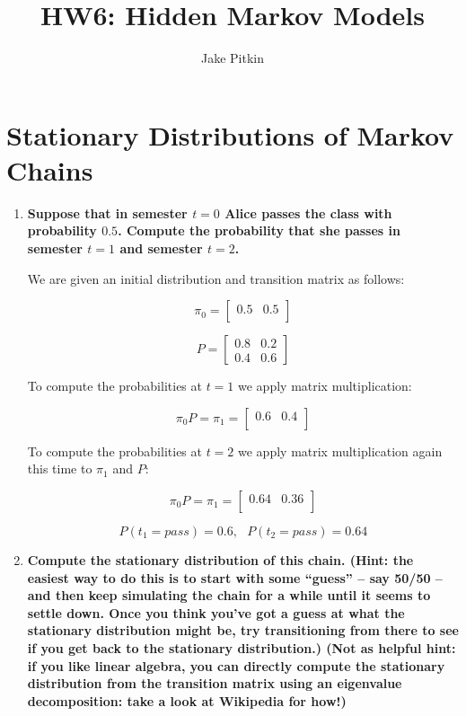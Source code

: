 \documentclass[fleqn]{hermans-hw}
\title{HW6: Hidden Markov Models}
\institute{University of Utah}
\author{Jake Pitkin}
\begin{document}
\maketitle
\section{Stationary Distributions of Markov Chains}

\begin{enumerate}
\item {\bf Suppose that in semester $t=0$ Alice passes the class with
  probability $0.5$.  Compute the probability that she passes in
  semester $t=1$ and semester $t=2$.}
  
We are given an initial distribution and transition matrix as follows:

$$\pi_0 = \begin{bmatrix} 0.5 & 0.5 \\ \end{bmatrix}$$

$$P = \begin{bmatrix}
 0.8 & 0.2 \\
 0.4 & 0.6
\end{bmatrix}$$

To compute the probabilities at $t = 1$ we apply matrix multiplication:

$$\pi_0 P = \pi_1 = \begin{bmatrix} 0.6 & 0.4 \\ \end{bmatrix}$$

To compute the probabilities at $t = 2$ we apply matrix multiplication again this time to $\pi_1$ and $P$:

$$\pi_0 P = \pi_1 = \begin{bmatrix} 0.64 & 0.36 \\ \end{bmatrix}$$

$$\boxed{P(t_1 = pass) = 0.6, \ \ \ P(t_2 = pass) = 0.64}$$

\item {\bf Compute the stationary distribution of this chain.  (Hint: the
  easiest way to do this is to start with some ``guess'' -- say 50/50
  -- and then keep simulating the chain for a while until it seems to
  settle down.  Once you think you've got a guess at what the
  stationary distribution might be, try transitioning from there to
  see if you get back to the stationary distribution.)  (Not as
  helpful hint: if you like linear algebra, you can directly compute
  the stationary distribution from the transition matrix using an
  eigenvalue decomposition: take a look at Wikipedia for how!)}
  

\end{enumerate}
\end{document}
